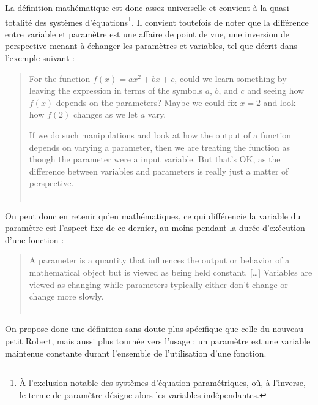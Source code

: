 La définition mathématique est donc assez universelle et convient à la quasi-totalité des systèmes d'équations\footnote{
	À l'exclusion notable des systèmes d'équation paramétriques, où, à l'inverse, le terme de paramètre désigne alors les variables indépendantes.
}.
Il convient toutefois de noter que la différence entre variable et paramètre est une affaire de point de vue, une inversion de perspective menant à échanger les paramètres et variables, tel que décrit dans l'exemple suivant :
\begin{quotation}
	\noindent \og
	For the function $f(x)=ax^2+bx+c$, could we learn something by leaving the expression in terms of the symbols $a$, $b$, and $c$ and seeing how $f(x)$ depends on the parameters?
	Maybe we could fix $x=2$ and look how $f(2)$ changes as we let $a$ vary.
	
	\noindent If we do such manipulations and look at how the output of a function depends on varying a parameter, then we are treating the function as though the parameter were a input variable.
	But that's OK, as the difference between variables and parameters is really just a matter of perspective.
	\fg{}\\
	\mbox{}~ \hfill \autocite{nykamp_function_2015}
\end{quotation}
On peut donc en retenir qu'en mathématiques, ce qui différencie la variable du paramètre est l'aspect fixe de ce dernier, au moins pendant la durée d'exécution d'une fonction : 
\begin{quotation}
	\noindent \og
	A parameter is a quantity that influences the output or behavior of a mathematical object but is viewed as being held constant. [\dots]
	Variables are viewed as changing while parameters typically either don't change or change more slowly.
	\fg{}\\
	\mbox{}~ \hfill \autocite{nykamp_parameter_2015}
\end{quotation}


On propose donc une définition sans doute plus spécifique que celle du nouveau petit Robert, mais aussi plus tournée vers l'usage : un paramètre est une variable maintenue constante durant l'ensemble de l'utilisation d'une fonction.


